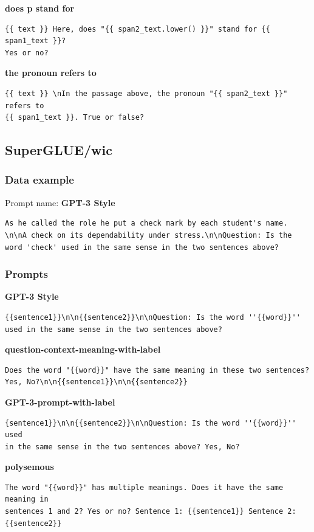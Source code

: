 \documentclass[twoside,11pt]{article}
\begin{document}
\noindent\textbf{does p stand for}
\begin{verbatim}
{{ text }} Here, does "{{ span2_text.lower() }}" stand for {{ span1_text }}? 
Yes or no?
\end{verbatim}

\noindent\textbf{the pronoun refers to}
\begin{verbatim}
{{ text }} \nIn the passage above, the pronoun "{{ span2_text }}" refers to 
{{ span1_text }}. True or false?
\end{verbatim}

\subsection{SuperGLUE/wic}

\subsubsection{Data example}

Prompt name: \textbf{GPT-3 Style}
\begin{verbatim}
As he called the role he put a check mark by each student's name.
\n\nA check on its dependability under stress.\n\nQuestion: Is the 
word 'check' used in the same sense in the two sentences above?
\end{verbatim}

\subsubsection{Prompts}

\textbf{GPT-3 Style}
\begin{verbatim}
{{sentence1}}\n\n{{sentence2}}\n\nQuestion: Is the word ''{{word}}'' 
used in the same sense in the two sentences above?
\end{verbatim}

\noindent\textbf{question-context-meaning-with-label}
\begin{verbatim}
Does the word "{{word}}" have the same meaning in these two sentences? 
Yes, No?\n\n{{sentence1}}\n\n{{sentence2}}
\end{verbatim}

\noindent\textbf{GPT-3-prompt-with-label}
\begin{verbatim}
{sentence1}}\n\n{{sentence2}}\n\nQuestion: Is the word ''{{word}}'' used 
in the same sense in the two sentences above? Yes, No?
\end{verbatim}

\noindent\textbf{polysemous}
\begin{verbatim}
The word "{{word}}" has multiple meanings. Does it have the same meaning in 
sentences 1 and 2? Yes or no? Sentence 1: {{sentence1}} Sentence 2: 
{{sentence2}}
\end{verbatim}
\end{document}
